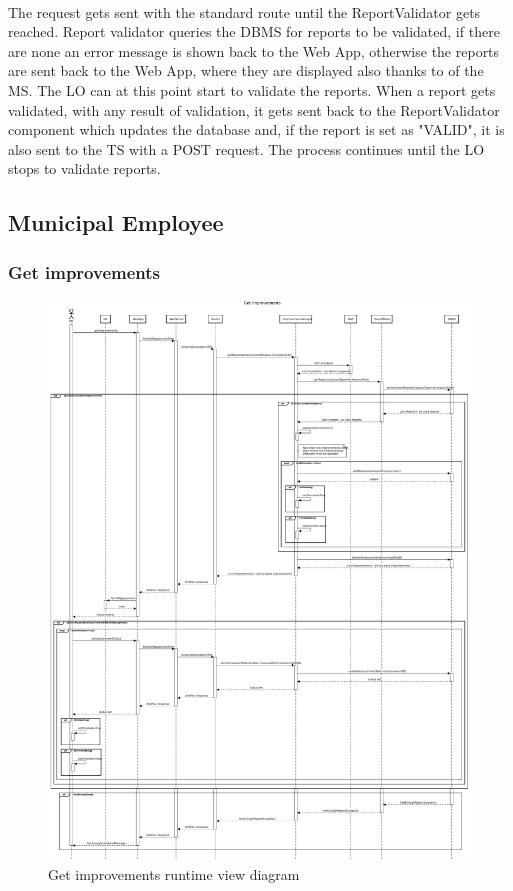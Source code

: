 					\paragraph{}
						The request gets sent with the standard route until the ReportValidator gets reached. Report validator queries the DBMS for reports to be validated, if there are none an error message is shown back to the Web App, otherwise the reports are sent back to the Web App, where they are displayed also thanks to of the MS.
						The LO can at this point start to validate the reports. When a report gets validated, with any result of validation, it gets sent back to the ReportValidator component which updates the database and, if the report is set as "VALID", it is also sent to the TS with a POST request. The process continues until the LO stops to validate reports.
			\clearpage
			\subsection{Municipal Employee}
				\subsubsection{Get improvements}
					\begin{figure}[!h]
						\centering
						\includegraphics[width=\textwidth]{images/DD2/RuntimeView/Authority/ME/GetImprovements.pdf}
						\caption{Get improvements runtime view diagram}
					\end{figure}
